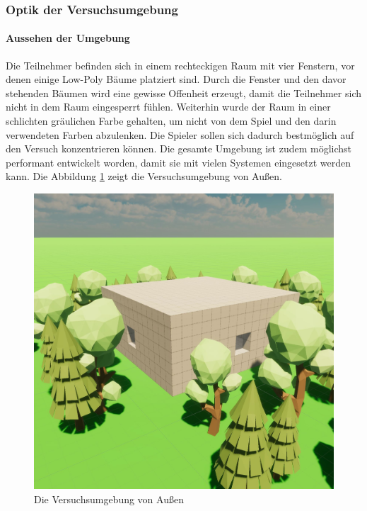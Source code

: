 \documentclass[a4paper,11pt]{article}%
\renewcommand{\\}{\vspace*{0.5\baselineskip} \newline}
\begin{document}
\newpage	
\subsubsection{Optik der Versuchsumgebung}
\paragraph{Aussehen der Umgebung}
Die Teilnehmer befinden sich in einem rechteckigen Raum mit vier Fenstern, vor denen einige Low-Poly Bäume platziert sind. Durch die Fenster und den davor stehenden Bäumen wird eine gewisse Offenheit erzeugt, damit die Teilnehmer sich nicht in dem Raum eingesperrt fühlen. Weiterhin wurde der Raum in einer schlichten gräulichen Farbe gehalten, um nicht von dem Spiel und den darin verwendeten Farben abzulenken. Die Spieler sollen sich dadurch bestmöglich auf den Versuch konzentrieren können. Die gesamte Umgebung ist zudem möglichst performant entwickelt worden, damit sie mit vielen Systemen eingesetzt werden kann. Die Abbildung \ref{Versuchsumgebung} zeigt die Versuchsumgebung von Außen.

\begin{figure}[H]
		\begin{footnotesize}
		\centering
			\includegraphics[scale=0.4]{Abbildungen/Versuchsumgebung/Raum.JPG}
			\caption[Die Versuchsumgebung von außen]{Die Versuchsumgebung von Außen}
			\label{Versuchsumgebung}
		\end{footnotesize}
	\end{figure}
\end{document}
